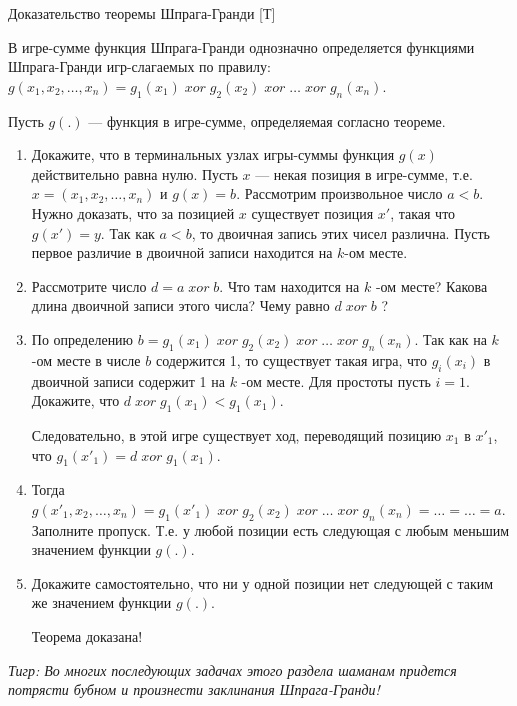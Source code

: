 \begin{problem}
 Доказательство теоремы Шпрага-Гранди [Т]\par
{}\par
В игре-сумме функция Шпрага-Гранди однозначно определяется функциями Шпрага-Гранди игр-слагаемых по правилу:  $g\left(x_{1},x_{2},\ldots,x_{n} \right)=g_{1} \left(x_{1} \right)\; xor\; g_{2} \left(x_{2} \right)\; xor\; \ldots \; xor\; g_{n} \left(x_{n} \right)$.
\par
Пусть  $g\left(.\right)$  --- функция в игре-сумме, определяемая согласно теореме.
\begin{enumerate}
\item 	Докажите, что в терминальных узлах игры-суммы функция  $g\left(x\right)$  действительно равна нулю.
Пусть  $x$  --- некая позиция в игре-сумме, т.е.  $x=\left(x_{1},x_{2},\ldots,x_{n} \right)$  и  $g\left(x\right)=b$. Рассмотрим произвольное число  $a<b$. Нужно доказать, что за позицией  $x$  существует позиция  $x'$, такая что  $g\left(x'\right)=y$.
Так как  $a<b$, то двоичная запись этих чисел различна. Пусть первое различие в двоичной записи находится на  $k$-ом месте.\par
\item	Рассмотрите число  $d=a\; xor\; b$. Что там находится на  $k$ -ом месте? Какова длина двоичной записи этого числа? Чему равно  $d\; xor\; b$ ?
\item 	По определению  $b=g_{1} \left(x_{1} \right)\; xor\; g_{2} \left(x_{2} \right)\; xor\; \ldots \; xor\; g_{n} \left(x_{n} \right)$. Так как на  $k$ -ом месте в числе  $b$  содержится 1, то существует такая игра, что  $g_{i} \left(x_{i} \right)$  в двоичной записи содержит 1 на  $k$ -ом месте. Для простоты пусть  $i=1$. Докажите, что  $d\; xor\; g_{1} \left(x_{1} \right)<g_{1} \left(x_{1} \right)$.\par
Следовательно, в этой игре существует ход, переводящий позицию  $x_{1} $  в  $x'_{1} $, что  $g_{1} \left(x'_{1} \right)=d\; xor\; g_{1} \left(x_{1} \right)$.
\item	Тогда  $g\left(x'_{1},x_{2},\ldots,x_{n} \right)=g_{1} \left(x'_{1} \right)\; xor\; g_{2} \left(x_{2} \right)\; xor\; \ldots \; xor\; g_{n} \left(x_{n} \right)=\ldots =\ldots =a$. Заполните пропуск.
Т.е. у любой позиции есть следующая с любым меньшим значением функции  $g\left(.\right)$.\par
\item	Докажите самостоятельно, что ни у одной позиции нет следующей с таким же значением функции  $g\left(.\right)$.\par
Теорема доказана!\par
\end{enumerate}
{\it Тигр: Во многих последующих задачах этого раздела  шаманам придется потрясти бубном и произнести заклинания Шпрага-Гранди!}




\begin{sol}

\end{sol}
\end{problem}






